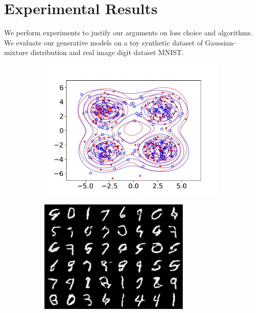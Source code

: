 \section{Experimental Results}
We perform experiments to justify our arguments on loss choice and algorithms. We evaluate our
generative models on a toy synthetic dataset of Gaussian-mixture distribution and real image digit dataset MNIST.
\begin{figure}[!ht]
  \captionsetup[subfigure]{justification=centering}
  \centering
  \begin{subfigure}[b]{0.24\textwidth}
    \centering
    \includegraphics[width=1\linewidth]{images/toy/gauss4/frame8.jpg}
    \caption{}
    \label{fig-toy}
  \end{subfigure}
  \centering
  \begin{subfigure}[b]{0.24\textwidth}
    \centering
    \includegraphics[width=0.8\linewidth]{images/mnist/fake/eot_18500_crop.png}\vspace{5pt}

\end{subfigure}
\end{figure}
